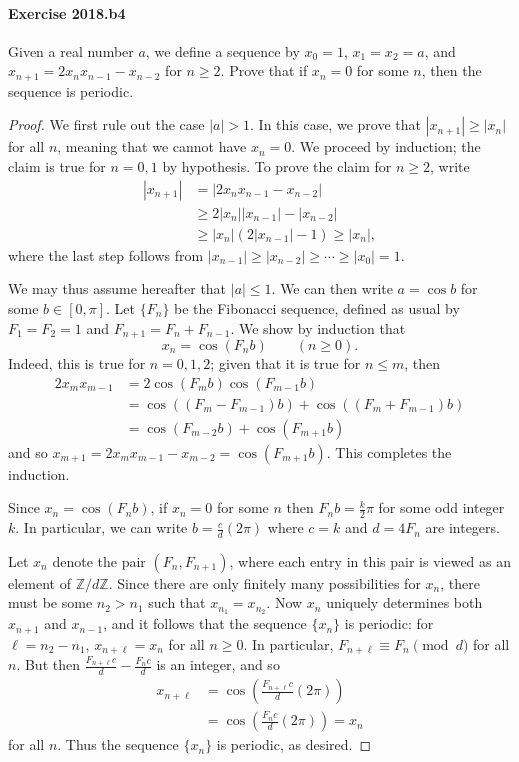 \documentclass{article}
\begin{document}
\paragraph{Exercise 2018.b4} Given a real number $a$, we define a sequence by $x_{0}=1$, $x_{1}=x_{2}=a$, and $x_{n+1}=2 x_{n} x_{n-1}-x_{n-2}$ for $n \geq 2$. Prove that if $x_{n}=0$ for some $n$, then the sequence is periodic.
\begin{proof}
    We first rule out the case $|a|>1$. In this case, we prove that $|x_{n+1}| \geq |x_n|$ for all $n$, meaning that we cannot have $x_n = 0$. We proceed by induction; the claim is true for $n=0,1$ by hypothesis. To prove the claim for  $n \geq 2$, write
\begin{align*}
|x_{n+1}| &= |2x_nx_{n-1}-x_{n-2}| \\
&\geq 2|x_n||x_{n-1}|-|x_{n-2}| \\
&\geq |x_n|(2|x_{n-1}|-1) \geq |x_n|,
\end{align*} 
where the last step follows from $|x_{n-1}| \geq |x_{n-2}| \geq \cdots \geq |x_0| = 1$.

We may thus assume hereafter that $|a|\leq 1$. We can then write $a = \cos b$ for some $b \in [0,\pi]$. 
Let $\{F_n\}$ be the Fibonacci sequence, defined as usual by $F_1=F_2=1$ and $F_{n+1}=F_n+F_{n-1}$. We show by induction that
\[
x_n = \cos(F_n b) \qquad (n \geq 0).
\]
Indeed, this is true for $n=0,1,2$; given that it is true for $n \leq m$, then
\begin{align*}
2x_mx_{m-1}&=2\cos(F_mb)\cos(F_{m-1}b) \\
&= \cos((F_m-F_{m-1})b)+\cos((F_m+F_{m-1})b) \\
&= \cos(F_{m-2}b)+\cos(F_{m+1}b)
\end{align*}
and so 
$x_{m+1} = 2x_mx_{m-1}-x_{m-2} = \cos(F_{m+1}b)$. This completes the induction.


Since $x_n = \cos(F_n b)$, if $x_n=0$ for some $n$ then $F_n b = \frac{k}{2} \pi$ for some odd integer $k$. In particular, we can write $b = \frac{c}{d}(2\pi)$ where $c = k$ and $d = 4F_n$ are integers.


Let $x_n$ denote the pair $(F_n,F_{n+1})$, where each entry in this pair is viewed as an element of $\mathbb{Z}/d\mathbb{Z}$. Since there are only finitely many possibilities for $x_n$, there must be some $n_2>n_1$ such that $x_{n_1}=x_{n_2}$. Now $x_n$ uniquely determines both $x_{n+1}$ and $x_{n-1}$, and it follows that the sequence $\{x_n\}$ is periodic: for $\ell = n_2-n_1$, $x_{n+\ell} = x_n$ for all $n \geq 0$. In particular, $F_{n+\ell} \equiv F_n \pmod{d}$ for all $n$. But then $\frac{F_{n+\ell}c}{d}-\frac{F_n c}{d}$ is an integer, and so
\begin{align*}
x_{n+\ell} &= \cos\left(\frac{F_{n+\ell}c}{d}(2\pi)\right)\\
& = \cos\left(\frac{F_n c}{d}(2\pi)\right) = x_n
\end{align*}
for all $n$. Thus the sequence $\{x_n\}$ is periodic, as desired.
\end{proof}
\end{document}
